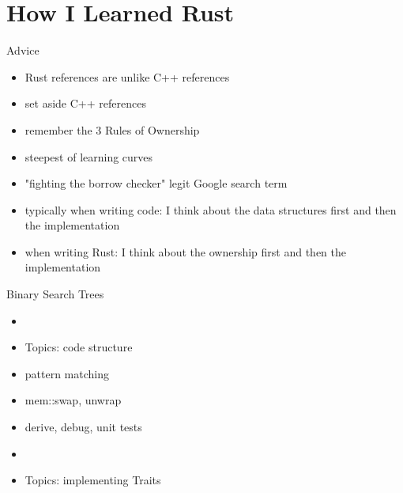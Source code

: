 \section{How I Learned Rust}


\begin{frame}{Advice}
	\begin{itemize}
	\item Rust references are unlike C++ references
	\item set aside C++ references
	\item remember the 3 Rules of Ownership
	\item steepest of learning curves
	\item "fighting the borrow checker" legit Google search term
	\item typically when writing code: I think about the data structures first and then the implementation
	\item when writing Rust: I think about the ownership first and then the implementation
	\end{itemize}
\end{frame}


\begin{frame}{Binary Search Trees}
	\begin{itemize}
		\item \href{https://github.com/mspiegel/rust-yaar/blob/master/src/llredblack/mod.rs}{\color{red}{Left-leaning red-black trees}}
		\item Topics: code structure
		\item pattern matching
		\item mem::swap, unwrap
		\item derive, debug, unit tests
		\item \href{https://github.com/mspiegel/rust-yaar/blob/master/src/bplus/mod.rs}{\color{red}{B+ trees}}
		\item Topics: implementing Traits
	\end{itemize}
\end{frame}

